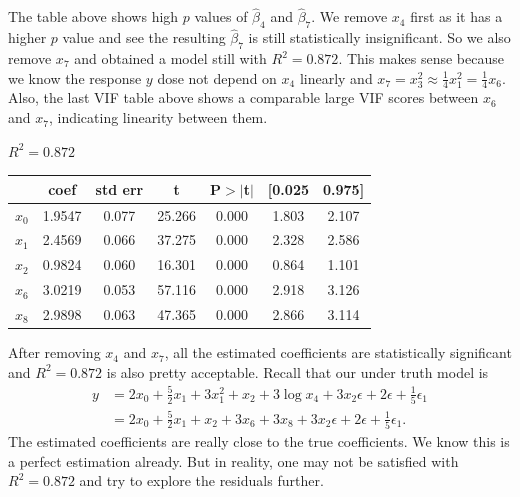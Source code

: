 \documentclass{article}
\begin{document}
The table above shows high $p$ values of $\hat{\beta}_4$ and $\hat{\beta}_7$. We remove $x_4$ first as it has a higher $p$ value and see the resulting $\hat{\beta}_7$ is still statistically insignificant. So we also remove $x_7$ and obtained a model still with $R^2 = 0.872$. This makes sense because we know the response $y$ dose not depend on $x_4$ linearly and $x_7 = x_3^2 \approx \frac 1 4 x_1^2 = \frac 1 4 x_6.$ Also, the last VIF table above shows a comparable large VIF scores between $x_6$ and $x_7$, indicating linearity between them. 
\begin{center}
$R^2 = 0.872$\\
\begin{tabular}{lcccccc}
\hline
                  & \textbf{coef} & \textbf{std err} & \textbf{t} & \textbf{P$> |$t$|$} & \textbf{[0.025} & \textbf{0.975]}  \\
\midrule
\textbf{$x_0$} &       1.9547  &        0.077     &    25.266  &         0.000        &        1.803    &        2.107     \\
\textbf{$x_1$} &       2.4569  &        0.066     &    37.275  &         0.000        &        2.328    &        2.586     \\
\textbf{$x_2$} &       0.9824  &        0.060     &    16.301  &         0.000        &        0.864    &        1.101     \\
\textbf{$x_6$} &       3.0219  &        0.053     &    57.116  &         0.000        &        2.918    &        3.126     \\
\textbf{$x_8$} &       2.9898  &        0.063     &    47.365  &         0.000        &        2.866    &        3.114     \\
\bottomrule
\end{tabular}
\end{center}
After removing $x_4$ and $x_7$, all the estimated coefficients are statistically significant and $R^2 = 0.872$ is also pretty acceptable. Recall that our under truth model is 
\begin{align*}\label{eq2}
y &= 2 x_0 + \frac 5 2 x_1 + 3 x_1^2 + x_2 + 3\log{x_4} + 3 x_2 \epsilon +  2 \epsilon + \frac 1 5 \epsilon_1 \\
&= 2 x_0 + \frac 5 2 x_1+ x_2 + 3 x_6  + 3 x_8+ 3 x_2 \epsilon +  2 \epsilon + \frac 1 5 \epsilon_1.
\end{align*}
The estimated coefficients are really close to the true coefficients. We know this is a perfect estimation already. But in reality, one may not be satisfied with $R^2 = 0.872$ and try to explore the residuals further.
\end{document}
